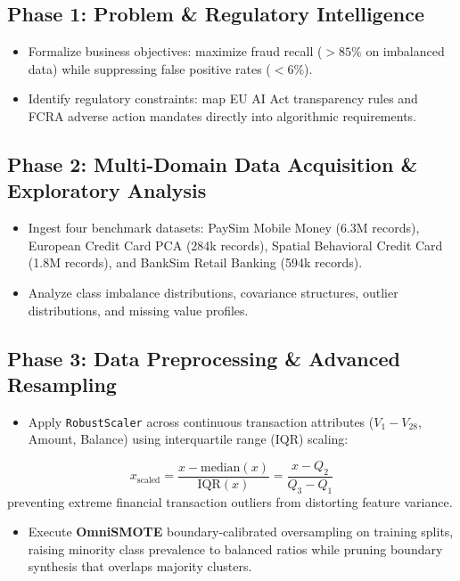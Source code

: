 \documentclass[12pt,a4paper,oneside]{report}
\begin{document}
\subsection{Phase 1: Problem \& Regulatory Intelligence}
\begin{itemize}[leftmargin=0.35in]
\item Formalize business objectives: maximize fraud recall ($> 85\%$ on imbalanced data) while suppressing false positive rates ($< 6\%$).
\item Identify regulatory constraints: map EU AI Act transparency rules and FCRA adverse action mandates directly into algorithmic requirements.
\end{itemize}

\subsection{Phase 2: Multi-Domain Data Acquisition \& Exploratory Analysis}
\begin{itemize}[leftmargin=0.35in]
\item Ingest four benchmark datasets: PaySim Mobile Money (6.3M records), European Credit Card PCA (284k records), Spatial Behavioral Credit Card (1.8M records), and BankSim Retail Banking (594k records).
\item Analyze class imbalance distributions, covariance structures, outlier distributions, and missing value profiles.
\end{itemize}

\subsection{Phase 3: Data Preprocessing \& Advanced Resampling}
\begin{itemize}[leftmargin=0.35in]
\item Apply \texttt{RobustScaler} across continuous transaction attributes ($V_1-V_{28}$, Amount, Balance) using interquartile range (IQR) scaling:
\end{itemize}
\begin{equation}
x_{\text{scaled}} = \frac{x - \text{median}(x)}{\text{IQR}(x)} = \frac{x - Q_2}{Q_3 - Q_1}
\end{equation}
preventing extreme financial transaction outliers from distorting feature variance.

\begin{itemize}[leftmargin=0.35in]
\item Execute \textbf{OmniSMOTE} boundary-calibrated oversampling on training splits, raising minority class prevalence to balanced ratios while pruning boundary synthesis that overlaps majority clusters.
\end{itemize}
\end{document}
